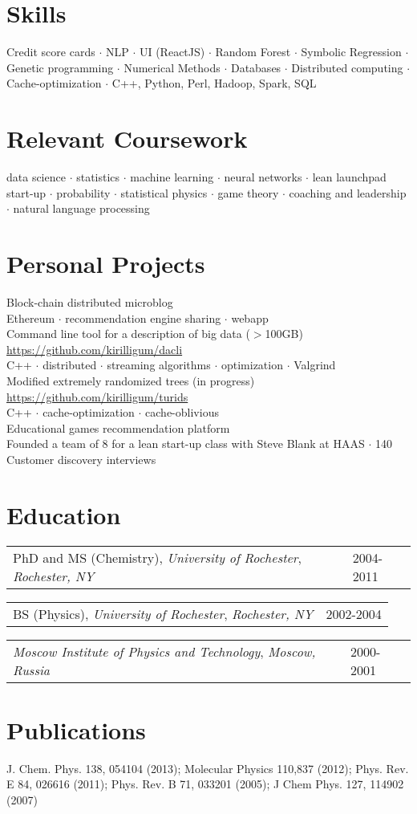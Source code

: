 \documentclass{res}
\makeatletter
\newcommand{\af}[3]{
\begin{tabular*}{\textwidth}[t]{@{}p{5.2in} l} 
    #1, \textit{#2} & #3\\
  \end{tabular*}
}
\newcommand{\skills}[2]{
  #1\\
  {\color[RGB]{106,106,106} #2}\\
}
\makeatother
\begin{document}
\begin{resume}
\section{Skills}
	Credit score cards $\cdot$
	NLP $\cdot$
	UI (ReactJS) $\cdot$
	Random Forest $\cdot$
	Symbolic Regression $\cdot$
	Genetic programming $\cdot$
	Numerical Methods $\cdot$
	Databases $\cdot$
	Distributed computing $\cdot$
	Cache-optimization $\cdot$
	C++, Python, Perl, Hadoop, Spark, SQL

\section{Relevant Coursework}
  data science $\cdot$
  statistics $\cdot$
  machine learning $\cdot$
  neural networks $\cdot$
  lean launchpad start-up $\cdot$
  probability $\cdot$
  statistical physics $\cdot$
  game theory $\cdot$
  coaching and leadership $\cdot$
  natural language processing
\\

\section{Personal Projects}
\skills{Block-chain distributed microblog}{
	Ethereum $\cdot$
	recommendation engine sharing $\cdot$
	webapp
}
\skills{Command line tool for a description of big data ($>$100GB) \url{https://github.com/kirilligum/dacli}}{
	C++ $\cdot$
	distributed $\cdot$
	streaming algorithms $\cdot$
	optimization $\cdot$
	Valgrind
}
\skills{Modified extremely randomized trees (in progress) \url{https://github.com/kirilligum/turids}}{
	C++ $\cdot$
	cache-optimization $\cdot$
	cache-oblivious
}
\skills{Educational games recommendation platform}{
  Founded a team of 8 for a lean start-up class with Steve Blank at HAAS $\cdot$ 
  140 Customer discovery interviews
}

\section{Education}          
\af{PhD and MS (Chemistry), \textit{University of Rochester}}{Rochester, NY}{2004-2011}
\af{BS (Physics), \textit{University of Rochester}}{Rochester, NY}{2002-2004}
\af{\textit{Moscow Institute of Physics and Technology}}{Moscow, Russia} {2000-2001}
\section{Publications}
  J. Chem. Phys.  138, 054104 (2013);
  Molecular Physics 110,837 (2012);
  Phys. Rev. E 84, 026616 (2011);
  Phys. Rev. B 71, 033201 (2005);
  J Chem Phys. 127, 114902 (2007)
\\


\end{resume}
\end{document}
